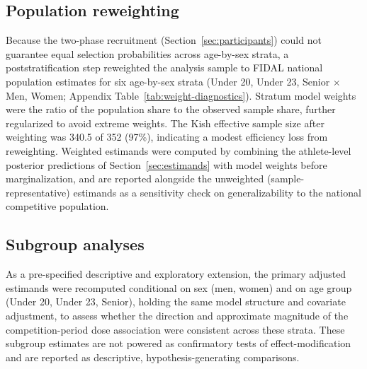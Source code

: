\subsection{Population reweighting}
\label{sec:weighting}
Because the two-phase recruitment (Section~\ref{sec:participants}) could not guarantee equal selection probabilities across age-by-sex strata, a poststratification step \citep{gelman2007poststrat} reweighted the analysis sample to FIDAL national population estimates for six age-by-sex strata (Under 20, Under 23, Senior $\times$ Men, Women; Appendix Table~\ref{tab:weight-diagnostics}). Stratum model weights were the ratio of the population share to the observed sample share, further regularized to avoid extreme weights. The Kish effective sample size after weighting was 340.5 of 352 (97\%), indicating a modest efficiency loss from reweighting. Weighted estimands were computed by combining the athlete-level posterior predictions of Section~\ref{sec:estimands} with model weights before marginalization, and are reported alongside the unweighted (sample-representative) estimands as a sensitivity check on generalizability to the national competitive population.

\subsection{Subgroup analyses}
\label{sec:subgroups}
As a pre-specified descriptive and exploratory extension, the primary adjusted estimands were recomputed conditional on sex (men, women) and on age group (Under 20, Under 23, Senior), holding the same model structure and covariate adjustment, to assess whether the direction and approximate magnitude of the competition-period dose association were consistent across these strata. These subgroup estimates are not powered as confirmatory tests of effect-modification and are reported as descriptive, hypothesis-generating comparisons.

